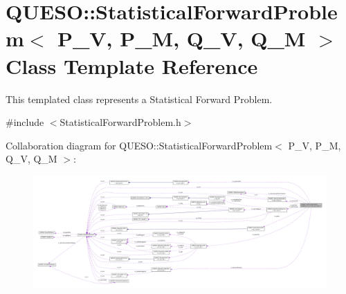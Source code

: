 \hypertarget{class_q_u_e_s_o_1_1_statistical_forward_problem}{\section{Q\-U\-E\-S\-O\-:\-:Statistical\-Forward\-Problem$<$ P\-\_\-\-V, P\-\_\-\-M, Q\-\_\-\-V, Q\-\_\-\-M $>$ Class Template Reference}
\label{class_q_u_e_s_o_1_1_statistical_forward_problem}
}


This templated class represents a Statistical Forward Problem.  




{\ttfamily \#include $<$Statistical\-Forward\-Problem.\-h$>$}



Collaboration diagram for Q\-U\-E\-S\-O\-:\-:Statistical\-Forward\-Problem$<$ P\-\_\-\-V, P\-\_\-\-M, Q\-\_\-\-V, Q\-\_\-\-M $>$\-:
\nopagebreak
\begin{figure}[H]
\begin{center}
\leavevmode
\includegraphics[width=350pt]{class_q_u_e_s_o_1_1_statistical_forward_problem__coll__graph}
\end{center}
\end{figure}
